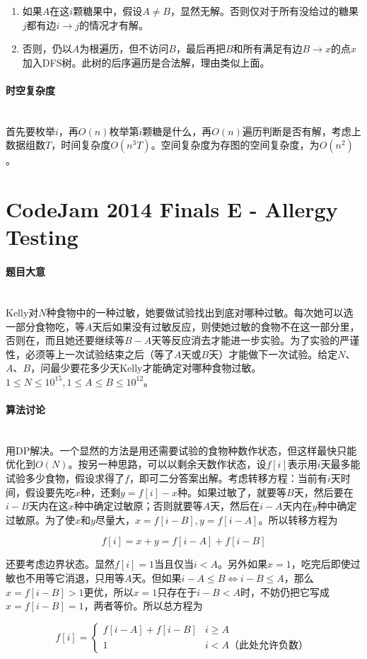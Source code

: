 \documentclass[UTF8]{ctexart}
\newcommand{\myparagraph}[1]{\paragraph{#1}\mbox{}\\}
\theoremstyle{nonumberplain}
\begin{document}
			\begin{enumerate}
				\item 如果$A$在这$i$颗糖果中，假设$A \not= B$，显然无解。否则仅对于所有没给过的糖果$j$都有边$i \to j$的情况才有解。
				\item 否则，仍以$A$为根遍历，但不访问$B$，最后再把$B$和所有满足有边$B \to x$的点$x$加入DFS树。此树的后序遍历是合法解，理由类似上面。
			\end{enumerate}
			
		\myparagraph{时空复杂度}
		
			首先要枚举$i$，再$O(n)$枚举第$i$颗糖是什么，再$O(n)$遍历判断是否有解，考虑上数据组数$T$，时间复杂度$O(n^3T)$。空间复杂度为存图的空间复杂度，为$O(n^2)$。
	
	\section{CodeJam 2014 Finals E - Allergy Testing}
	
		\myparagraph{题目大意}
	
			Kelly对$N$种食物中的一种过敏，她要做试验找出到底对哪种过敏。每次她可以选一部分食物吃，等$A$天后如果没有过敏反应，则使她过敏的食物不在这一部分里，否则在，而且她还要继续等$B-A$天等反应消去才能进一步实验。为了实验的严谨性，必须等上一次试验结束之后（等了$A$天或$B$天）才能做下一次试验。给定$N$、$A$、$B$，问最少要花多少天Kelly才能确定对哪种食物过敏。$1 \leq N \leq 10^{15}, 1 \leq A \leq B \leq 10^{12}$。
	
		\myparagraph{算法讨论}
		
			用DP解决。一个显然的方法是用还需要试验的食物种数作状态，但这样最快只能优化到$O(N)$。按另一种思路，可以以剩余天数作状态，设$f[i]$表示用$i$天最多能试验多少食物，假设求得了$f$，即可二分答案出解。考虑转移方程：当前有$i$天时间，假设要先吃$x$种，还剩$y=f[i]-x$种。如果过敏了，就要等$B$天，然后要在$i-B$天内在这$x$种中确定过敏原；否则就要等$A$天，然后在$i-A$天内在$y$种中确定过敏原。为了使$x$和$y$尽量大，$x=f[i-B], y=f[i-A]$。所以转移方程为
			
			$$f[i]=x+y=f[i-A]+f[i-B]$$
			
			还要考虑边界状态。显然$f[i]=1$当且仅当$i<A$。另外如果$x=1$，吃完后即使过敏也不用等它消退，只用等$A$天。但如果$i-A \leq B \Leftrightarrow i-B \leq A$，那么$x=f[i-B]>1$更优，所以$x=1$只存在于$i-B<A$时，不妨仍把它写成$x=f[i-B]=1$，两者等价。所以总方程为
			
			$$f[i]=\left\{\begin{array}{ll}
				f[i-A]+f[i-B] & i \geq A \\
				1 & i<A \mbox{（此处允许负数）}
			\end{array}\right.$$
			
\end{document}
